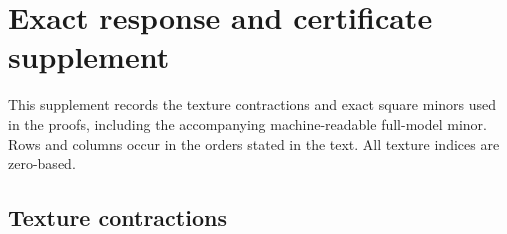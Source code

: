 \section{Exact response and certificate supplement}\label{supp:exact}

This supplement records the texture contractions and exact square minors used
in the proofs, including the accompanying machine-readable full-model minor.
Rows and columns occur in the orders stated in the text.  All texture indices
are zero-based.

\setcounter{MaxMatrixCols}{14}
\newcommand{\certmatrix}[1]{%
\begin{center}
\resizebox{\linewidth}{!}{$\begin{pmatrix}#1\end{pmatrix}$}
\end{center}}

\subsection{Texture contractions}\label{supp:textures}

